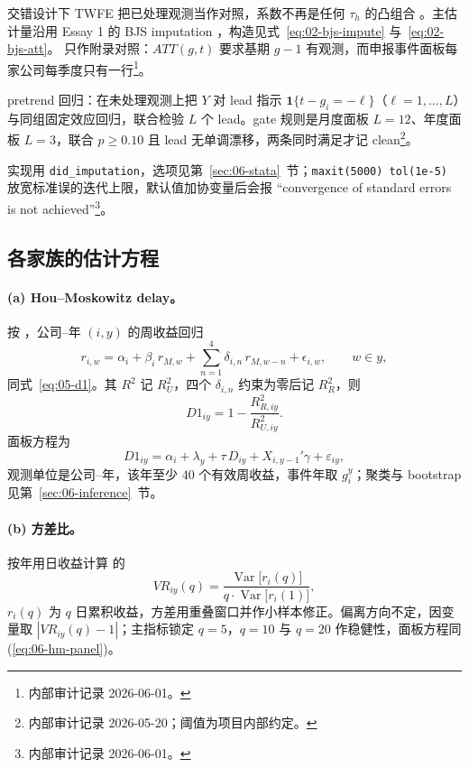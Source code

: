 \documentclass[a4paper,11pt]{ctexart}
\begin{document}
交错设计下 TWFE 把已处理观测当作对照，系数不再是任何 $\tau_h$ 的凸组合 \citep{bakerlarckerwang2022,sunabraham2021}。主估计量沿用 Essay 1 的 BJS imputation \citep{borusyakjaravelspiess2024}，构造见式~\eqref{eq:02-bjs-impute} 与~\eqref{eq:02-bjs-att}。\citet{callawaysantanna2021} 只作附录对照：$ATT(g,t)$ 要求基期 $g-1$ 有观测，而申报事件面板每家公司每季度只有一行\footnote{内部审计记录 2026-06-01。}。

pretrend 回归：在未处理观测上把 $Y$ 对 lead 指示 $\mathbf{1}\{t-g_i=-\ell\}$（$\ell=1,\dots,L$）与同组固定效应回归，联合检验 $L$ 个 lead。gate 规则是月度面板 $L=12$、年度面板 $L=3$，联合 $p\ge0.10$ 且 lead 无单调漂移，两条同时满足才记 clean\footnote{内部审计记录 2026-05-20；阈值为项目内部约定。}。

实现用 \texttt{did\_imputation}，选项见第~\ref{sec:06-stata}~节；\texttt{maxit(5000) tol(1e-5)} 放宽标准误的迭代上限，默认值加协变量后会报 “convergence of standard errors is not achieved”\footnote{内部审计记录 2026-06-01。}。

\subsection{各家族的估计方程}\label{sec:06-equations}

\paragraph{(a) Hou--Moskowitz delay。}
按 \citet{houmoskowitz2005}，公司--年 $(i,y)$ 的周收益回归
\begin{equation}\label{eq:06-hm-first}
r_{i,w}=\alpha_{i}+\beta_{i}\,r_{M,w}+\sum_{n=1}^{4}\delta_{i,n}\,r_{M,w-n}+\epsilon_{i,w},\qquad w\in y,
\end{equation}
同式~\eqref{eq:05-d1}。其 $R^2$ 记 $R^2_{U}$，四个 $\delta_{i,n}$ 约束为零后记 $R^2_{R}$，则
\begin{equation}\label{eq:06-D1}
D1_{iy}=1-\frac{R^{2}_{R,iy}}{R^{2}_{U,iy}} .
\end{equation}
面板方程为
\begin{equation}\label{eq:06-hm-panel}
D1_{iy}=\alpha_i+\lambda_y+\tau\,D_{iy}+X_{i,y-1}'\gamma+\varepsilon_{iy},
\end{equation}
观测单位是公司--年，该年至少 40 个有效周收益，事件年取 $g_i^{y}$；聚类与 bootstrap 见第~\ref{sec:06-inference}~节。

\paragraph{(b) 方差比。}
按年用日收益计算 \citet{lomackinlay1988} 的
\begin{equation}\label{eq:06-VR}
VR_{iy}(q)=\frac{\operatorname{Var}\big[r_{i}(q)\big]}{q\cdot\operatorname{Var}\big[r_{i}(1)\big]},
\end{equation}
$r_i(q)$ 为 $q$ 日累积收益，方差用重叠窗口并作小样本修正。偏离方向不定，因变量取 $|VR_{iy}(q)-1|$；主指标锁定 $q=5$，$q=10$ 与 $q=20$ 作稳健性，面板方程同 (\ref{eq:06-hm-panel})。
\end{document}
